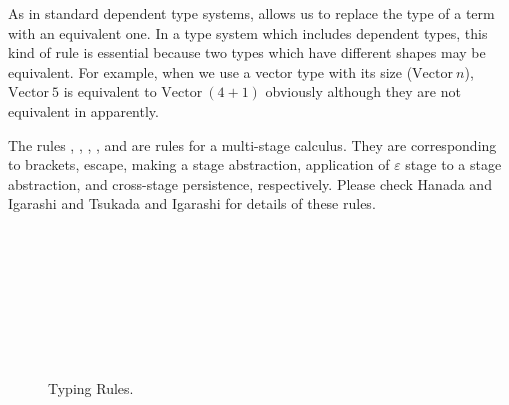 {}
As in standard dependent type systems, \TConv{} allows us to replace
the type of a term with an equivalent one.  
In a type system which includes dependent types, this kind of rule is essential
because two types which have different shapes may be equivalent.
For example, when we use a vector type with its size ($\textrm{Vector}\ n$),
$\textrm{Vector}\ 5$ is equivalent to $\textrm{Vector}\ (4+1)$ obviously although they are not equivalent in apparently.


The rules \TTB, \TTBL, \TGen, \TIns, and \TCsp{} are rules for a multi-stage calculus.
They are corresponding to brackets, escape, making a stage abstraction, 
application of $\varepsilon$ stage to a stage abstraction, and cross-stage persistence, respectively.
Please check Hanada and Igarashi \cite{Hanada2014} and Tsukada and Igarashi \cite{Tsukada} for details of these rules.

\begin{figure}
	\begin{center}
		 \\[2mm]
		 \\[2mm]
		 \\[2mm]
		 \\[2mm]
		 \\[2mm]
		 \andalso
		 \\[2mm]
		 \\[2mm]
		 \andalso
		\caption{Typing Rules.}
		\label{fig:typing-rules}
	\end{center}
\end{figure}

